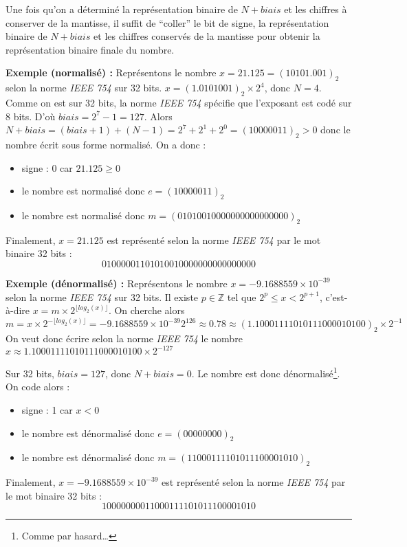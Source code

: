 \documentclass[../../main.tex]{subfiles}
\begin{document}
Une fois qu'on a déterminé la représentation binaire de $N + biais$ et les chiffres à conserver de la mantisse, il suffit de ``coller'' le bit de signe, la représentation binaire de $N + biais$ et les chiffres conservés de la mantisse pour obtenir la représentation binaire finale du nombre.

\textbf{Exemple (normalisé) : } Représentons le nombre $x = 21.125 = (10101.001)_{2}$ selon la norme \textit{IEEE 754} sur 32 bits. \newline
$x = (1.0101001)_{2}\times{2^{4}}$, donc $N = 4$. Comme on est sur 32 bits, la norme \textit{IEEE 754} spécifie que l'exposant est codé sur 8 bits. D'où $biais = 2^{7}-1 = 127$. Alors $N + biais =  (biais + 1) + (N-1) = 2^{7} + 2^{1} + 2^{0} = (10000011)_{2} > 0$ donc le nombre écrit sous forme normalisé. On a donc :
\begin{itemize}
     \item signe : 0 car $21.125 \geq 0$
     \item le nombre est normalisé donc $e = (10000011)_{2}$
     \item le nombre est normalisé donc $m = (01010010000000000000000)_{2}$
\end{itemize}
Finalement, $x = 21.125$ est représenté selon la norme \textit{IEEE 754} par le mot binaire 32 bits : $$01000001101010010000000000000000$$

\textbf{Exemple (dénormalisé) : } Représentons le nombre $x = -9.1688559\times{10^{-39}}$ selon la norme \textit{IEEE 754} sur 32 bits. \newline
Il existe $p\in{\mathbb{Z}}$ tel que $2^{p}\leq x < 2^{p+1}$, c'est-à-dire $x = m\times{2^{\lfloor log_{2}(x)\rfloor}}$.\newline
On cherche alors $m = x\times 2^{-\lfloor log_2(x)\rfloor} = -9.1688559\times10^{-39}2^{126} \approx 0.78 \approx (1.10001111010111000010100)_{2}\times{2^{-1}}$ \newline
On veut donc écrire selon la norme \textit{IEEE 754} le nombre $x \approx 1.10001111010111000010100\times{2^{-127}}$

Sur 32 bits, $biais = 127$, donc $N + biais = 0$. Le nombre est donc dénormalisé\footnote{Comme par hasard\dots}. On code alors :
\begin{itemize}
  \item signe : 1 car $x < 0$
  \item le nombre est dénormalisé donc $e = (00000000)_2$
  \item le nombre est dénormalisé donc $m = (11000111101011100001010)_2$
\end{itemize}
Finalement, $x = -9.1688559\times{10^{-39}}$ est représenté selon la norme \textit{IEEE 754} par le mot binaire 32 bits : $$10000000011000111101011100001010$$
\end{document}

